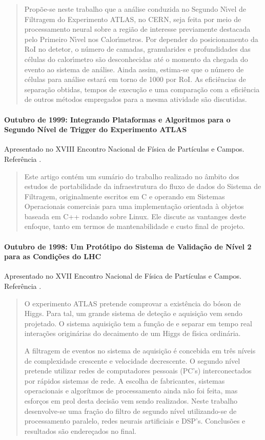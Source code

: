 \begin{quotation}
Prop\~oe-se neste trabalho que a an\'alise conduzida no Segundo N\'{\i}vel de
Filtragem do Experimento ATLAS, no CERN, seja feita por meio de processamento
neural sobre a regi\~ao de interesse previamente destacada pelo Primeiro
N\'{\i}vel nos Calor\'{\i}metros. Por depender do posicionamento da RoI no
detetor, o n\'umero de camadas, granularides e profundidades das c\'elulas do
calor\'{\i}metro s\~ao desconhecidas at\'e o momento da chegada do evento ao
sistema de an\'alise. Ainda assim, estima-se que o n\'umero de c\'elulas para
an\'alise estar\'a em torno de 1000 por RoI.  As efici\^encias de
separa\c{c}\~ao obtidas, tempos de execu\c{c}\~ao e uma compara\c{c}\~ao com a
efici\^encia de outros m\'etodos empregados para a mesma atividade s\~ao
discutidas.
\end{quotation}

\paragraph{Outubro de 1999: Integrando Plataformas e Algoritmos para o Segundo
Nível de Trigger do Experimento ATLAS} Apresentado no XVIII Encontro 
Nacional de Física de Partículas e Campos. Referência \cite{aa:enfpc-99}.

\begin{quotation}
Este artigo contém um sumário do trabalho realizado no âmbito dos estudos de
portabilidade da infraestrutura do fluxo de dados do Sistema de Filtragem,
originalmente escritos em C e operando em Sistemas Operacionais comerciais
para uma implementação orientada à objetos baseada em C++ rodando sobre
Linux. Ele discute as vantanges deste enfoque, tanto em termos de
mantenabilidade e custo final de projeto.
\end{quotation}

\paragraph{Outubro de 1998: Um Protótipo do Sistema de Validação de
Nível 2 para as Condições do LHC} Apresentado no XVII Encontro Nacional de
Física de Partículas e Campos. Referência \cite{aa:enfpc-98}.

\begin{quotation}
O experimento ATLAS pretende comprovar a existência do bóson de Higgs. Para
tal, um grande sistema de deteção e aquisição vem sendo projetado. O sistema
aquisição tem a função de e separar em tempo real interações originárias do
decaimento de um Higgs de física ordinária.

A filtragem de eventos no sistema de aquisição é concebida em três níveis de
complexidade crescente e velocidade decrescente. O segundo nível pretende
utilizar redes de computadores pessoais (PC's) interconectados por rápidos
sistemas de rede. A escolha de fabricantes, sistemas operacionais e algorítmos
de processamento ainda não foi feita, mas esforços em prol desta decisão vem
sendo realizados. Neste trabalho desenvolve-se uma fração do filtro de segundo
nível utilizando-se de processamento paralelo, redes neurais artificiais e
DSP's. Conclusões e resultados são endereçados no final.
\end{quotation}

